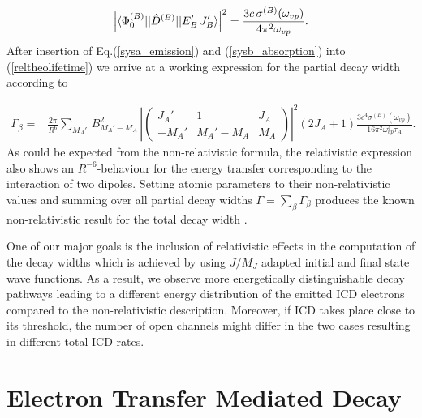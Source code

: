 \begin{equation}\label{sysb_absorption}
  \left| \braket{\Phi_0^{(B)} || \hat{D}^{(B)} || E'_{B}\, J'_{B}} \right|^2
   = \frac{3c\,\sigma^{(B)}(\omega_{vp})}{4\pi^2\omega_{vp}} .
\end{equation}
After insertion of Eq.(\ref{sysa_emission}) and (\ref{sysb_absorption})
into (\ref{reltheolifetime}) we arrive at a working expression for the
partial decay width according to

\begin{align}\label{reltheolifetime_exp}
 \Gamma_\beta =& \frac{2\pi}{R^6} \sum\limits_{M_A'} \, B_{M_A'-M_A}^2 \, \left| \left(
\begin{array}{ccc}
J_A'  & 1        & J_A\\
-M_A' & M_A'-M_A & M_A
\end{array}\right) \right|^2
 (2J_A+1)\frac{3c^4 \sigma^{(B)}(\omega_{vp})}{16\pi^2\omega_{vp}^4\tau_A} .
\end{align}
As could be expected from the non-relativistic formula, the relativistic
expression also shows an $R^{-6}$-behaviour for the energy transfer
corresponding to the interaction of two dipoles.
Setting atomic parameters to their non-relativistic values and summing
over all partial decay widths 
$\Gamma=\sum\limits_\beta \Gamma_\beta$ produces the known
non-relativistic result for the total decay width \cite{Averbukh04,Gokhberg10_1}.

One of our major goals is the inclusion of relativistic effects in the
computation of the decay widths which is achieved by using $J/M_J$ adapted
initial and final state wave functions. As a result, we observe more
energetically distinguishable decay pathways leading to a different energy
distribution of the emitted ICD electrons compared to the non-relativistic
description. Moreover, if ICD takes place close to its threshold, the number
of open channels might differ in the two cases resulting in different total
ICD rates.


\section{Electron Transfer Mediated Decay}
\label{subs_etmd}

